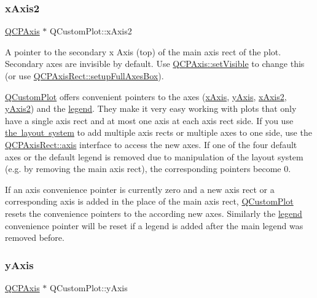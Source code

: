 \subsubsection{\texorpdfstring{xAxis2}{xAxis2}}
{\footnotesize\ttfamily \mbox{\hyperlink{class_q_c_p_axis}{Q\+C\+P\+Axis}} $\ast$ Q\+Custom\+Plot\+::x\+Axis2}

A pointer to the secondary x Axis (top) of the main axis rect of the plot. Secondary axes are invisible by default. Use \mbox{\hyperlink{class_q_c_p_layerable_a3bed99ddc396b48ce3ebfdc0418744f8}{Q\+C\+P\+Axis\+::set\+Visible}} to change this (or use \mbox{\hyperlink{class_q_c_p_axis_rect_a5fa906175447b14206954f77fc7f1ef4}{Q\+C\+P\+Axis\+Rect\+::setup\+Full\+Axes\+Box}}).

\mbox{\hyperlink{class_q_custom_plot}{Q\+Custom\+Plot}} offers convenient pointers to the axes (\mbox{\hyperlink{class_q_custom_plot_a9a79cd0158a4c7f30cbc702f0fd800e4}{x\+Axis}}, \mbox{\hyperlink{class_q_custom_plot_af6fea5679725b152c14facd920b19367}{y\+Axis}}, \mbox{\hyperlink{class_q_custom_plot_ada41599f22cad901c030f3dcbdd82fd9}{x\+Axis2}}, \mbox{\hyperlink{class_q_custom_plot_af13fdc5bce7d0fabd640f13ba805c0b7}{y\+Axis2}}) and the \mbox{\hyperlink{class_q_custom_plot_a4eadcd237dc6a09938b68b16877fa6af}{legend}}. They make it very easy working with plots that only have a single axis rect and at most one axis at each axis rect side. If you use \mbox{\hyperlink{}{the layout system}} to add multiple axis rects or multiple axes to one side, use the \mbox{\hyperlink{class_q_c_p_axis_rect_a583ae4f6d78b601b732183f6cabecbe1}{Q\+C\+P\+Axis\+Rect\+::axis}} interface to access the new axes. If one of the four default axes or the default legend is removed due to manipulation of the layout system (e.\+g. by removing the main axis rect), the corresponding pointers become 0.

If an axis convenience pointer is currently zero and a new axis rect or a corresponding axis is added in the place of the main axis rect, \mbox{\hyperlink{class_q_custom_plot}{Q\+Custom\+Plot}} resets the convenience pointers to the according new axes. Similarly the \mbox{\hyperlink{class_q_custom_plot_a4eadcd237dc6a09938b68b16877fa6af}{legend}} convenience pointer will be reset if a legend is added after the main legend was removed before. \mbox{\label{class_q_custom_plot_af6fea5679725b152c14facd920b19367}} 
\subsubsection{\texorpdfstring{yAxis}{yAxis}}
{\footnotesize\ttfamily \mbox{\hyperlink{class_q_c_p_axis}{Q\+C\+P\+Axis}} $\ast$ Q\+Custom\+Plot\+::y\+Axis}

